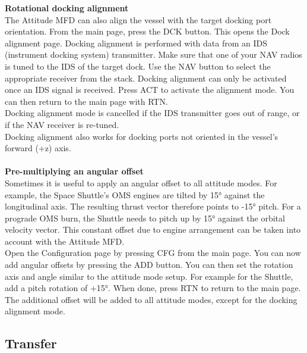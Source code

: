 \documentclass[Orbiter User Manual.tex]{subfiles}
\begin{document}
\noindent
\textbf{Rotational docking alignment}\\
The Attitude MFD can also align the vessel with the target docking port orientation. From the main page, press the DCK button. This opens the Dock alignment page. Docking alignment is performed with data from an IDS (instrument docking system) transmitter. Make sure that one of your NAV radios is tuned to the IDS of the target dock. Use the NAV button to select the appropriate receiver from the stack. Docking alignment can only be activated once an IDS signal is received. Press ACT to activate the alignment mode. You can then return to the main page with RTN.\\
Docking alignment mode is cancelled if the IDS transmitter goes out of range, or if the NAV receiver is re-tuned.\\
Docking alignment also works for docking ports not oriented in the vessel’s forward (+z) axis.\\
\\
\textbf{Pre-multiplying an angular offset}\\
Sometimes it is useful to apply an angular offset to all attitude modes. For example, the Space Shuttle’s OMS engines are tilted by 15° against the longitudinal axis. The resulting thrust vector therefore points to -15° pitch. For a prograde OMS burn, the Shuttle needs to pitch up by 15° against the orbital velocity vector. This constant offset due to engine arrangement can be taken into account with the Attitude MFD.\\
Open the Configuration page by pressing CFG from the main page. You can now add angular offsets by pressing the ADD button. You can then set the rotation axis and angle similar to the attitude mode setup. For example for the Shuttle, add a pitch rotation of +15°. When done, press RTN to return to the main page. The additional offset will be added to all attitude modes, except for the docking alignment mode.


\subsection{Transfer}
\end{document}
